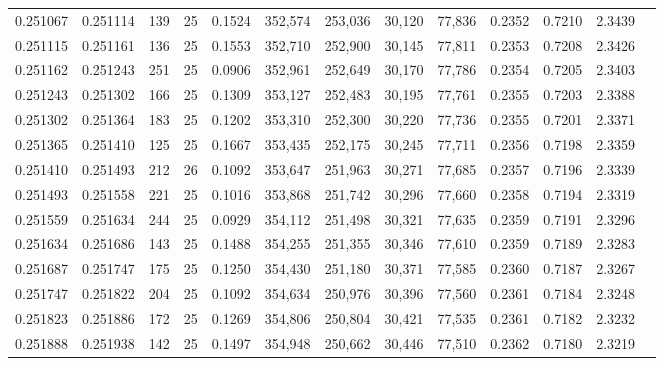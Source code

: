 \begin{tabular}{rrrrrrrrrrrrr}
0.251067 & 0.251114 &   139 &  25 &                                     0.1524 & 352,574 & 253,036 &  30,120 &  77,836 & 0.2352 & 0.7210 & 2.3439 \\
0.251115 & 0.251161 &   136 &  25 &                                     0.1553 & 352,710 & 252,900 &  30,145 &  77,811 & 0.2353 & 0.7208 & 2.3426 \\
0.251162 & 0.251243 &   251 &  25 &                                     0.0906 & 352,961 & 252,649 &  30,170 &  77,786 & 0.2354 & 0.7205 & 2.3403 \\
0.251243 & 0.251302 &   166 &  25 &                                     0.1309 & 353,127 & 252,483 &  30,195 &  77,761 & 0.2355 & 0.7203 & 2.3388 \\
0.251302 & 0.251364 &   183 &  25 &                                     0.1202 & 353,310 & 252,300 &  30,220 &  77,736 & 0.2355 & 0.7201 & 2.3371 \\
0.251365 & 0.251410 &   125 &  25 &                                     0.1667 & 353,435 & 252,175 &  30,245 &  77,711 & 0.2356 & 0.7198 & 2.3359 \\
0.251410 & 0.251493 &   212 &  26 &                                     0.1092 & 353,647 & 251,963 &  30,271 &  77,685 & 0.2357 & 0.7196 & 2.3339 \\
0.251493 & 0.251558 &   221 &  25 &                                     0.1016 & 353,868 & 251,742 &  30,296 &  77,660 & 0.2358 & 0.7194 & 2.3319 \\
0.251559 & 0.251634 &   244 &  25 &                                     0.0929 & 354,112 & 251,498 &  30,321 &  77,635 & 0.2359 & 0.7191 & 2.3296 \\
0.251634 & 0.251686 &   143 &  25 &                                     0.1488 & 354,255 & 251,355 &  30,346 &  77,610 & 0.2359 & 0.7189 & 2.3283 \\
0.251687 & 0.251747 &   175 &  25 &                                     0.1250 & 354,430 & 251,180 &  30,371 &  77,585 & 0.2360 & 0.7187 & 2.3267 \\
0.251747 & 0.251822 &   204 &  25 &                                     0.1092 & 354,634 & 250,976 &  30,396 &  77,560 & 0.2361 & 0.7184 & 2.3248 \\
0.251823 & 0.251886 &   172 &  25 &                                     0.1269 & 354,806 & 250,804 &  30,421 &  77,535 & 0.2361 & 0.7182 & 2.3232 \\
0.251888 & 0.251938 &   142 &  25 &                                     0.1497 & 354,948 & 250,662 &  30,446 &  77,510 & 0.2362 & 0.7180 & 2.3219 \\

\end{tabular}
